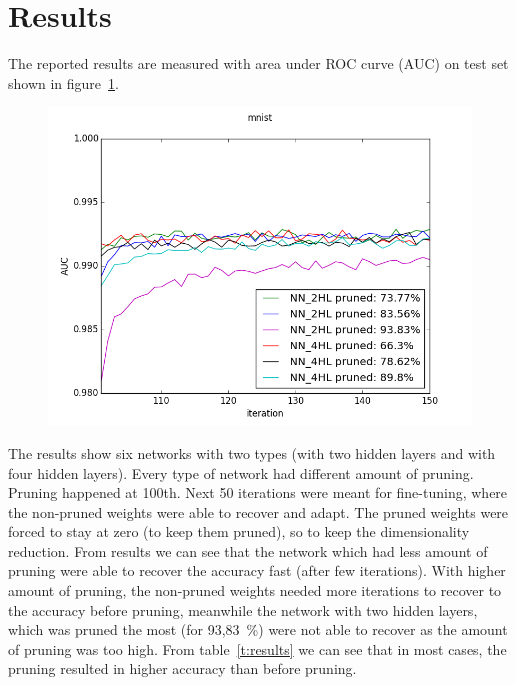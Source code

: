 \documentclass{article} %
\begin{document}
\section{Results}
The reported results are measured with area under ROC curve (AUC) on test set 
shown in figure~\ref{f:results}. 

\begin{figure}[!ht]
\centering
\includegraphics[width=0.8\linewidth]{mnist_new.png}
\label{f:results}
\end{figure}

The results show six networks with two types (with two hidden layers and with 
four hidden layers). Every type of network had different amount of pruning. 
Pruning happened at 100th. Next 
50 iterations were meant for fine-tuning, where the non-pruned weights were able 
to recover and adapt. The pruned weights were forced to stay at zero (to keep 
them pruned), so to keep the dimensionality reduction. From results we can see 
that the network which had less amount of pruning were able to recover the 
accuracy fast (after few iterations). With higher amount of pruning, 
the non-pruned weights needed more iterations to recover to the accuracy before 
pruning, meanwhile the network with two hidden layers, which was pruned the most 
(for 93,83~\%) were not able to recover as the amount of pruning was too high.
From table~\ref{t:results} we can see that in most cases, the pruning resulted
in higher accuracy than before pruning. 
\end{document}
